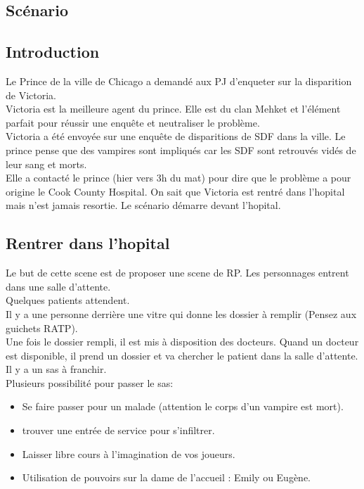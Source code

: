 \documentclass[oneside,12pt]{book}
\begin{document}
\begin{flushleft}
\chapter{Scénario}


\section{Introduction}
Le Prince de la ville de Chicago a demandé aux PJ d'enqueter sur la disparition de Victoria.  \\
Victoria est la meilleure agent du prince. Elle est du clan Mehket et l'élément parfait pour réussir une enquête et neutraliser le problème. \\
Victoria a été envoyée sur une enquête de disparitions de SDF dans la ville.
Le prince pense que des vampires sont impliqués car les SDF sont retrouvés vidés de leur sang et morts. \\
Elle a contacté le prince (hier vers 3h du mat) pour dire que le problème a pour origine le Cook County Hospital. On sait que Victoria est rentré dans l'hopital mais n'est jamais resortie.
Le scénario démarre devant l'hopital. 

\section{Rentrer dans l'hopital}
Le but de cette scene est de proposer une scene de RP. Les personnages entrent dans une salle d'attente.\\ 
Quelques patients attendent.\\
Il y a une personne derrière une vitre qui donne les dossier à remplir (Pensez aux guichets RATP). \\
Une fois le dossier rempli, il est mis à disposition des docteurs. Quand un docteur est disponible, il prend un dossier et va chercher le patient dans la salle d'attente. Il y a un sas à franchir. \\
\vspace{0.5cm}
Plusieurs possibilité pour passer le sas:\\
\begin{itemize}
\item Se faire passer pour un malade (attention le corps d'un vampire est mort).\\
\item trouver une entrée de service pour s'infiltrer.\\
\item Laisser libre cours à l'imagination de vos joueurs.\\
\item Utilisation de pouvoirs sur la dame de l'accueil : Emily ou Eugène.
\end{itemize}


\end{flushleft}
\end{document}
